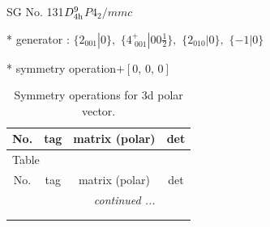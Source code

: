 \documentclass[fleqn,8pt]{jsarticle}
\begin{document}
\setcounter{MaxMatrixCols}{32}

\renewcommand{\tablename}{Table~}
\renewcommand{\figurename}{Figure~}
\begin{center}
\LARGE
SG No. 131\quad$D_{\rm 4h}^{9}$\quad$P4_2/mmc$\quad[ tetragonal ]
\end{center}

* generator : $\{2{}_{001}|0\},\,\,\{4^{+}_{\,\,001}|0 0 \frac{1}{2}\},\,\,\{2{}_{010}|0\},\,\,\{-1|0\}$

* symmetry operation\quad$+\left[ 0,\, 0,\, 0 \right]$
\renewcommand{\arraystretch}{1.3}
\begin{longtable}{cccc}
\caption{Symmetry operations for 3d polar vector.}
 \\
 \hline \hline
No. & tag & matrix (polar) & det \\ \hline \endfirsthead

\multicolumn{3}{l}{\tablename\ \thetable{}} \\
 \hline \hline
No. & tag & matrix (polar) & det \\ \hline \endhead

 \hline \hline
\multicolumn{3}{r}{\footnotesize\it continued ...} \\ \endfoot

 \hline \hline
\multicolumn{3}{r}{} \\ \endlastfoot


\end{longtable}
\end{document}
